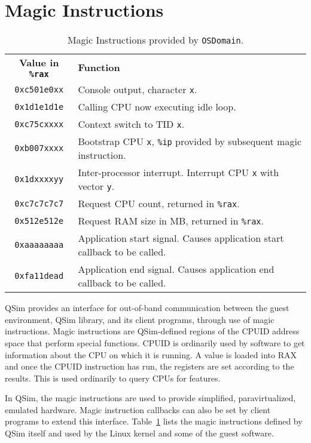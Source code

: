 \documentclass[letterpaper, 10pt]{book}
\begin{document}
\section{Magic Instructions} \label{sec:magic}

\begin{table}
\begin{tabular}{c|l}
  \textbf{Value in \texttt{\%rax}}&\textbf{Function}\\
  \texttt{0xc501e0xx}&Console output, character \texttt{x}.\\
  \texttt{0x1d1e1d1e}&Calling CPU now executing idle loop.\\
  \texttt{0xc75cxxxx}&Context switch to TID \texttt{x}.\\
  \texttt{0xb007xxxx}&Bootstrap CPU \texttt{x}, \texttt{\%ip} provided by
                      subsequent magic instruction.\\
  \texttt{0x1dxxxxyy}&Inter-processor interrupt. Interrupt CPU \texttt{x} with
                      vector \texttt{y}.\\
  \texttt{0xc7c7c7c7}&Request CPU count, returned in \texttt{\%rax}.\\
  \texttt{0x512e512e}&Request RAM size in MB, returned in \texttt{\%rax}.\\
  \texttt{0xaaaaaaaa}&Application start signal. Causes application start 
                      callback to be called.\\
  \texttt{0xfa11dead}&Application end signal. Causes application end callback
                      to be called.\\
\end{tabular}
\caption{Magic Instructions provided by \texttt{OSDomain}.}
\label{table:magic}
\end{table}

QSim provides an interface for out-of-band communication between the guest
environment, QSim library, and its client programs, through use of magic
instructions. Magic instructions are QSim-defined regions of the CPUID address
space that perform special functions. CPUID is ordinarily used by software to
get information about the CPU on which it is running. A value is loaded into RAX
and once the CPUID instruction has run, the registers are set according to the
results. This is used ordinarily to query CPUs for features.

In QSim, the magic instructions are used to provide simplified, paravirtualized,
emulated hardware. Magic instruction callbacks can also be set by client
programs to extend this interface. Table~\ref{table:magic} lists the magic
instructions defined by QSim itself and used by the Linux kernel and some of the
guest software.
\end{document}
